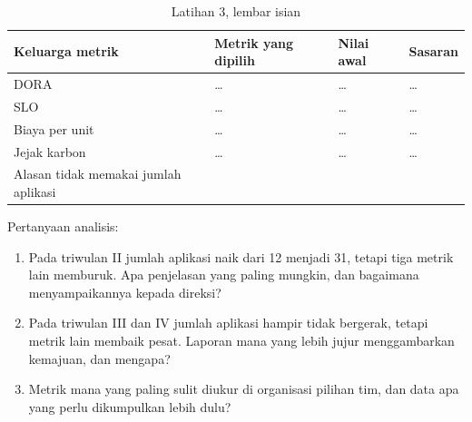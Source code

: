 \begin{table}[!htb]
  \centering
  \caption{Latihan 3, lembar isian}
  \label{tab:ch14-lat3-hasil}
  \footnotesize
  \begin{tabularx}{\textwidth}{>{\raggedright\arraybackslash}p{2.6cm}
      >{\raggedright\arraybackslash}X >{\raggedright\arraybackslash}p{2.0cm}
      >{\raggedright\arraybackslash}p{2.0cm}}
    \hline
    \textbf{Keluarga metrik} & \textbf{Metrik yang dipilih} & \textbf{Nilai awal} &
      \textbf{Sasaran} \\ \hline
    DORA & \dots & \dots & \dots \\ \hline
    SLO & \dots & \dots & \dots \\ \hline
    Biaya per unit & \dots & \dots & \dots \\ \hline
    Jejak karbon & \dots & \dots & \dots \\ \hline
    Alasan tidak memakai jumlah aplikasi & \multicolumn{3}{>{\raggedright\arraybackslash}p{7.0cm}}{\dots}
      \\ \hline
  \end{tabularx}
\end{table}

Pertanyaan analisis:
\begin{enumerate}
  \item Pada triwulan II jumlah aplikasi naik dari 12 menjadi 31, tetapi tiga metrik lain memburuk.
        Apa penjelasan yang paling mungkin, dan bagaimana menyampaikannya kepada direksi?
  \item Pada triwulan III dan IV jumlah aplikasi hampir tidak bergerak, tetapi metrik lain membaik
        pesat. Laporan mana yang lebih jujur menggambarkan kemajuan, dan mengapa?
  \item Metrik mana yang paling sulit diukur di organisasi pilihan tim, dan data apa yang perlu
        dikumpulkan lebih dulu?
\end{enumerate}
